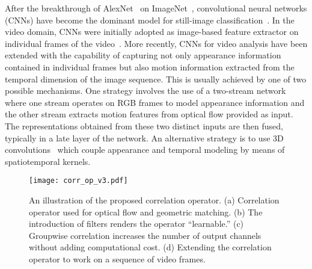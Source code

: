 \documentclass[10pt,twocolumn,letterpaper]{article}
\begin{document}
After the breakthrough of AlexNet~\cite{Krizhevsky12} on ImageNet~\cite{deng2009imagenet}, convolutional neural networks (CNNs) have become the dominant model for still-image classification~\cite{lecun1998gradient,SimonyanZ14a,Szegedy15,KaimingHe16}. 
In the video domain, CNNs were initially adopted as image-based feature extractor on individual frames of the video~\cite{Karpathy14}. More recently, CNNs for video analysis have been extended with the capability of capturing not only  appearance information contained in individual frames but also motion information extracted from the temporal dimension of the image sequence. This is usually achieved by one of two possible mechanisms. One strategy involves the use of a two-stream network~\cite{SimonyanZ14,wang2015towards,FeichtenhoferPZ16,WangXW0LTG16,qiu2019learning,crasto2019mars} where one stream operates on RGB frames to model appearance information and the other stream extracts motion features from optical flow provided as input. The representations obtained from these two distinct inputs are then fused, typically in a late layer of the network. An alternative strategy is to use 3D convolutions~\cite{baccouche2011sequential,Ming2013,Tran15,linsuniccv15,tran2017closer,P3D,xie2017rethinking,diba2019dynamonet} which couple appearance and temporal modeling by means of spatiotemporal kernels. 

\begin{figure*}[t] 
\centering
\centerline{\texttt{[image: corr\_op\_v3.pdf]}}
   \caption{An illustration of the proposed correlation operator. (a) Correlation operator used for optical flow and geometric matching. (b) The introduction of filters renders the operator ``learnable.'' (c) Groupwise correlation increases the number of output channels without adding computational cost. (d) Extending the correlation operator to work on a sequence of video frames.} 
   \label{fig:corr_op}
\end{figure*}
\end{document}
